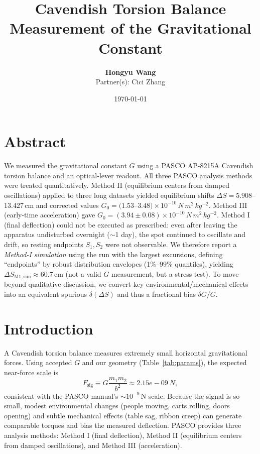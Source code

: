 \documentclass[11pt]{article}
\title{Cavendish Torsion Balance Measurement of the Gravitational Constant}
\author{\textbf{Hongyu Wang}\\Partner(s): Cici Zhang}
\date{\today}
\begin{document}
\maketitle

\section*{Abstract}
We measured the gravitational constant $G$ using a PASCO AP-8215A Cavendish torsion balance and an optical-lever readout.
All three PASCO analysis methods were treated quantitatively.
Method II (equilibrium centers from damped oscillations) applied to three long datasets yielded equilibrium shifts $\Delta S=5.908$--13.427\,cm and corrected values
$G_0=(1.53$--$3.48)\times10^{-10}\,\si{N\,m^2\,kg^{-2}}$.
Method III (early-time acceleration) gave $G_0=(3.94\pm0.08)\times10^{-10}\,\si{N\,m^2\,kg^{-2}}$.
Method I (final deflection) could not be executed as prescribed: even after leaving the apparatus undisturbed overnight ($\sim$1 day), the spot continued to oscillate and drift, so resting endpoints $S_1,S_2$ were not observable.
We therefore report a \emph{Method-I simulation} using the run with the largest excursions, defining ``endpoints'' by robust distribution envelopes (1\%--99\% quantiles), yielding $\Delta S_{\mathrm{M1,sim}}\approx 60.7$\,cm (not a valid $G$ measurement, but a stress test).
To move beyond qualitative discussion, we convert key environmental/mechanical effects into an equivalent spurious $\delta(\Delta S)$ and thus a fractional bias $\delta G/G$.

\section{Introduction}
A Cavendish torsion balance measures extremely small horizontal gravitational forces.
Using accepted $G$ and our geometry (Table~\ref{tab:params}), the expected near-force scale is
\begin{equation}
F_{\mathrm{sig}} \equiv G\frac{m_1 m_2}{b^2} \approx 2.15e-09\ \si{N},
\end{equation}
consistent with the PASCO manual's $\sim 10^{-9}$\,N scale.
Because the signal is so small, modest environmental changes (people moving, carts rolling, doors opening) and subtle mechanical effects (table sag, ribbon creep) can generate comparable torques and bias the measured deflection.
PASCO provides three analysis methods:
Method I (final deflection), Method II (equilibrium centers from damped oscillations), and Method III (acceleration).
\end{document}
